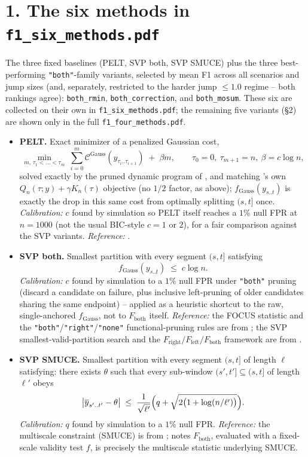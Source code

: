 \documentclass[11pt]{article}
\newcommand{\C}{\mathcal{C}}
\begin{document}
\section*{1. The six methods in \texttt{f1\_six\_methods.pdf}}

The three fixed baselines (PELT, SVP both, SVP SMUCE) plus the three
best-performing \texttt{"both"}-family variants, selected by mean F1
across all scenarios and jump sizes (and, separately, restricted to the
harder jump $\le1.0$ regime -- both rankings agree): \texttt{both\_rmin},
\texttt{both\_correction}, and \texttt{both\_mosum}. These six are
collected on their own in \texttt{f1\_six\_methods.pdf}; the remaining
five variants (\S2) are shown only in the full \texttt{f1\_four\_methods.pdf}.

\begin{itemize}

\item \textbf{PELT.} Exact minimizer of a penalized Gaussian cost,
\[
\min_{m,\,\tau_1<\dots<\tau_m}\ \sum_{i=0}^{m}\C^{\text{Gauss}}(y_{\tau_i..\tau_{i+1}})
\;+\;\beta m,
\qquad \tau_0=0,\ \tau_{m+1}=n,\ \beta=c\log n,
\]
solved exactly by the pruned dynamic program of \cite{killick2012}, and
matching \cite{runge2026svp}'s own $Q_n(\tau;y)+\gamma K_n(\tau)$
objective (no $1/2$ factor, as above); $f_{\mathrm{Gauss}}(y_{s..t})$ is
exactly the drop in this same cost from optimally splitting $(s,t]$ once.
\emph{Calibration:} $c$ found by simulation so PELT itself reaches a $1\%$
null FPR at $n=1000$ (not the usual BIC-style $c=1$ or $2$), for a fair
comparison against the SVP variants. \emph{Reference:}
\cite{killick2012}.

\item \textbf{SVP both.} Smallest partition with every segment
$(s,t]$ satisfying
\[
f_{\mathrm{Gauss}}(y_{s..t}) \;\le\; c\log n.
\]
\emph{Calibration:} $c$ found by simulation to a $1\%$ null FPR under
\texttt{"both"} pruning (discard a candidate on failure, plus inclusive
left-pruning of older candidates sharing the same endpoint) -- applied as
a heuristic shortcut to the raw, single-anchored $f_{\mathrm{Gauss}}$, not
to $F_{\mathrm{both}}$ itself.
\emph{Reference:} the FOCUS statistic and the
\texttt{"both"}/\texttt{"right"}/\texttt{"none"} functional-pruning rules
are from \cite{romano2023}; the SVP smallest-valid-partition search and
the $F_{\mathrm{right}}/F_{\mathrm{left}}/F_{\mathrm{both}}$ framework are
from \cite{runge2026svp}.

\item \textbf{SVP SMUCE.} Smallest partition with every segment $(s,t]$
of length $\ell$ satisfying: there exists $\theta$ such that every
sub-window $(s',t']\subseteq(s,t]$ of length $\ell'$ obeys
\[
\bigl|\overline{y}_{s'..t'}-\theta\bigr| \;\le\;
\frac{1}{\sqrt{\ell'}}\Bigl(q+\sqrt{2\bigl(1+\log(n/\ell')\bigr)}\Bigr).
\]
\emph{Calibration:} $q$ found by simulation to a $1\%$ null FPR.
\emph{Reference:} the multiscale constraint (SMUCE) is from
\cite{frick2014}; \cite{runge2026svp} notes $F_{\mathrm{both}}$, evaluated
with a fixed-scale validity test $f$, is precisely the multiscale
statistic underlying SMUCE.


\end{itemize}
\end{document}
